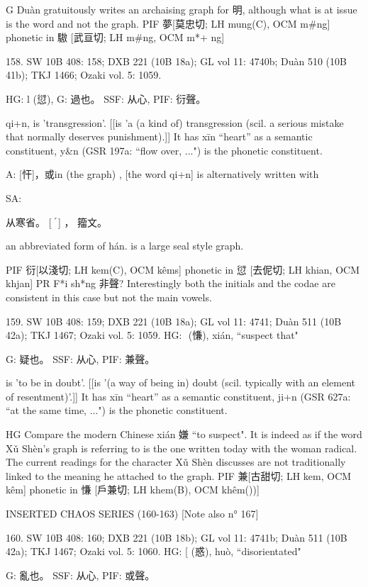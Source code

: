 G	Duàn gratuitously writes an archaising graph for 明, although what is at issue is the word and not the graph.
PIF     夢[莫忠切; LH mung(C), OCM m\#ng] phonetic in 䮯 [武亘切; LH m\#ng, OCM m*+ ng]

158. SW 10B 408: 158; DXB 221 (10B 18a); GL vol 11: 4740b; Duàn 510 (10B 41b); TKJ 1466; Ozaki vol. 5: 1059.

HG: l (愆),
G:	過也。
SSF: 从心,
PIF: 衍聲。


qi+n,
is 'transgression'. [[is 'a (a kind of) transgression (scil. a serious mistake that normally deserves punishment).]]
It has xīn ``heart'' as a semantic constituent,
y&n (GSR 197a: ``flow over, ...") is the phonetic constituent.

A:	[忓]，或in (the graph)	, [the word qi+n] is alternatively written with


SA:

从寒省。
    [ ֝ ] ， 籀文。

an abbreviated form of hán. is a large seal style graph.

PIF     衍[以淺切; LH kem(C), OCM kêms] phonetic in 愆 [去伲切; LH khian, OCM khjan]
PR	F*i sh*ng 非聲? Interestingly both the initials and the codae are consistent in this case but not the main vowels.


159. SW 10B 408: 159; DXB 221 (10B 18a); GL vol 11: 4741; Duàn 511 (10B 42a); TKJ 1467; Ozaki vol. 5: 1059.
HG:  (慊), xián, ``suspect that"

G:	疑也。
SSF: 从心,
PIF: 兼聲。

is 'to be in doubt'. [[is '(a way of being in) doubt (scil. typically with an element of resentment)'.]]
It has xīn ``heart'' as a semantic constituent,
ji+n (GSR 627a: ``at the same time, ...") is the phonetic constituent.



HG Compare the modern Chinese xián 嫌 ``to suspect". It is indeed as if the word Xǔ Shèn's graph is referring to is the one written today with the woman radical. The current readings for the character Xǔ Shèn discusses are not traditionally linked to the meaning he attached to the graph.
PIF    兼[古甜切; LH kem, OCM kêm] phonetic in 慊 [戶兼切; LH khem(B), OCM khêm())]

INSERTED CHAOS SERIES (160-163) [Note also n° 167]

160. SW 10B 408: 160; DXB 221 (10B 18b); GL vol 11: 4741b; Duàn 511 (10B 42a); TKJ 1467; Ozaki vol. 5: 1060.
HG: [ (惑), huò, ``disorientated"

G:	亂也。
SSF: 从心,
PIF: 或聲。

